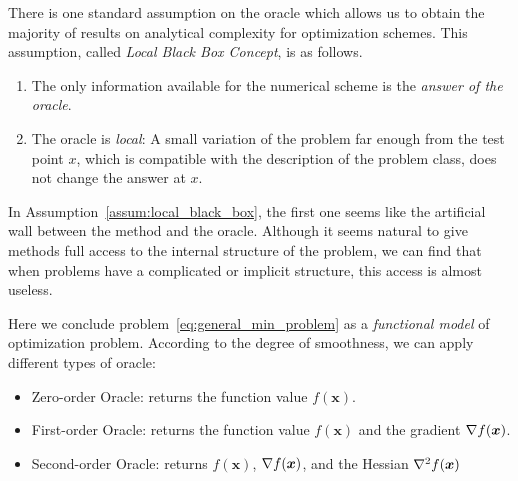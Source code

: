 There is one standard assumption on the oracle which allows us to obtain the majority of results on analytical complexity for optimization schemes. This assumption, called \emph{Local Black Box Concept}, is as follows.

\begin{assum}\label{assum:local_black_box}
    \begin{enumerate}
        \item The only information available for the numerical scheme is the \emph{answer of the oracle}.
        \item The oracle is \emph{local}: A small variation of the problem far enough from the test point \(x\), which is compatible with the description of the problem class, does not change the answer at \(x\).
    \end{enumerate}
\end{assum}

In Assumption~\ref{assum:local_black_box}, the first one seems like the artificial wall between the method and the oracle. Although it seems natural to give methods full access to the internal structure of the problem,
we can find that when problems have a complicated or implicit structure, this access is almost useless.

Here we conclude problem~\ref{eq:general_min_problem} as a \emph{functional model} of optimization problem. According to the degree of smoothness, we can apply different types of oracle:
\begin{itemize}
    \item Zero-order Oracle: returns the function value \(f(\bm{x})\).
    \item First-order Oracle: returns the function value \(f(\bm{x})\) and the gradient \(\nabla f(\bm{x})\).
    \item Second-order Oracle: returns \(f(\bm{x})\), \(\nabla f(\bm{x})\), and the Hessian \(\nabla^2 f(\bm{x})\)
\end{itemize}

